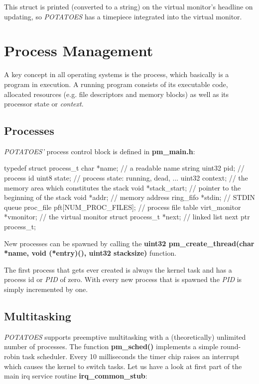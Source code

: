 \documentclass[11pt,a4paper]{scrartcl}
\begin{document}
This struct is printed (converted to a string) on the virtual monitor's headline on updating, so \textit{POTATOES} has a timepiece integrated into the virtual monitor.
\pagebreak

\section{Process Management}
A key concept in all operating systems is the process, which basically is a program in execution. A running program consists of its executable code, allocated resources (e.g. file descriptors and memory blocks) as well as its processor state or \textit{context}. 

\subsection{Processes}
\textit{\textit{POTATOES}'} process control block is defined in \textbf{pm\_main.h}:

\begin{code}
typedef struct process_t {	
	char *name; // a readable name string
	uint32 pid; // process id
	uint8 state; // process state: running, dead, ...
	uint32 context; // the memory area which constitutes the stack
	void *stack_start; // pointer to the beginning of the stack
	void *addr; // memory address
	ring_fifo *stdin; // STDIN queue
	proc_file pft[NUM_PROC_FILES]; // process file table
	virt_monitor *vmonitor; // the virtual monitor
	struct process_t *next; // linked list next ptr
} process_t;
\end{code}

New processes can be spawned by calling the \textbf{uint32 pm\_create\_thread(char *name, void (*entry)(), uint32 stacksize)} function.

The first process that gets ever created is always the kernel task and has a process id or \textit{PID} of zero. With every new process that is spawned the \textit{PID} is simply incremented by one. 

\hypertarget{SCHEDULER}{}
\subsection{Multitasking}
\textit{POTATOES} supports preemptive multitasking with a (theoretically) unlimited number of processes. The function \textbf{pm\_sched()} implements a simple round-robin task scheduler.
Every 10 milliseconds the timer chip raises an interrupt which causes the kernel to switch tasks. Let us have a look at first part of the main irq service routine \textbf{irq\_common\_stub}:
\end{document}
